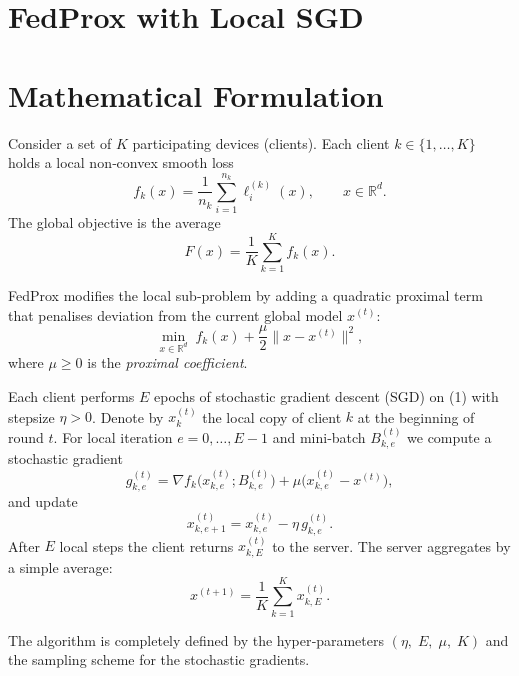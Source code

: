 \documentclass[11pt]{article}
\begin{document}
\section*{FedProx with Local SGD}

\section*{Mathematical Formulation}
Consider a set of $K$ participating devices (clients).  
Each client $k\in\{1,\dots,K\}$ holds a local non‑convex smooth loss 
\[
f_k(x)=\frac{1}{n_k}\sum_{i=1}^{n_k} \ell_i^{(k)}(x),\qquad x\in\mathbb{R}^d .
\]
The global objective is the average
\[
F(x)=\frac{1}{K}\sum_{k=1}^{K} f_k(x).
\]

FedProx modifies the local sub‑problem by adding a quadratic proximal term that penalises deviation from the current global model $x^{(t)}$:
\[
\min_{x\in\mathbb{R}^d}\; 
f_k(x)+\frac{\mu}{2}\|x-x^{(t)}\|^2 ,
\tag{1}
\]
where $\mu\ge 0$ is the \emph{proximal coefficient}.

Each client performs $E$ epochs of stochastic gradient descent (SGD) on (1) with stepsize $\eta>0$.
Denote by $x^{(t)}_k$ the local copy of client $k$ at the beginning of round $t$.
For local iteration $e=0,\dots,E-1$ and mini‑batch $B^{(t)}_{k,e}$ we compute a stochastic gradient
\[
g^{(t)}_{k,e}= \nabla f_k\bigl(x^{(t)}_{k,e};B^{(t)}_{k,e}\bigr)+\mu\bigl(x^{(t)}_{k,e}-x^{(t)}\bigr),
\]
and update
\[
x^{(t)}_{k,e+1}=x^{(t)}_{k,e}-\eta\, g^{(t)}_{k,e}.
\tag{2}
\]
After $E$ local steps the client returns $x^{(t)}_{k,E}$ to the server.  
The server aggregates by a simple average:
\[
x^{(t+1)}=\frac{1}{K}\sum_{k=1}^{K}x^{(t)}_{k,E}.
\tag{3}
\]

The algorithm is completely defined by the hyper‑parameters 
$(\eta,\;E,\;\mu,\;K)$ and the sampling scheme for the stochastic gradients.
\end{document}
